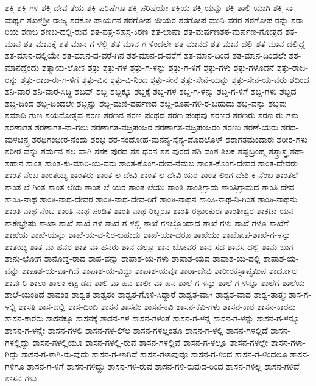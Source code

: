 ಶಕ್ತಿ
ಶಕ್ತಿ-ಗಳ
ಶಕ್ತಿ-ದೇವ-ತೆಯ
ಶಕ್ತಿ-ಪರಿಷೆಗೂ
ಶಕ್ತಿ-ಪರಿಷೆಯೇ
ಶಕ್ತಿಯ
ಶಕ್ತಿ-ಯನ್ನು
ಶಕ್ತಿ-ಶಾಲಿ-ಯಾಗಿ
ಶಕ್ತಿ-ಸಾ-ಮರ್ಥ್ಯ
ಶಖಳಶ್ರೀ-ರಾಜ್ಯ
ಶಠಕೋ-ಪಾರ್ಯನ
ಶಠಗೋಪ-ಜೀಯರ
ಶಠಗೋಪ-ಮುನಿ-ವರರ
ಶಠಗೋಪ-ರನ್ನು
ಶಠಾ-ರಿಯ
ಶಣಬ
ಶಣಬ-ದಲ್ಲಿ-ರುವ
ಶತ-ಪತ್ರ-ಸಹಸ್ರ-ಕಿರಣ
ಶತ-ಭಾಷಾ
ಶತ-ಮರ್ಷಣಶಠ-ಮರ್ಷಣ-ಗೋತ್ರದ
ಶತ-ಮಾನ
ಶತ-ಮಾನಕ್ಕೆ
ಶತ-ಮಾನ-ಗ-ಳಲ್ಲಿ
ಶತ-ಮಾನ-ಗ-ಳಿಂದಲೇ
ಶತ-ಮಾನದ
ಶತ-ಮಾನ-ದಲ್ಲಿ
ಶತ-ಮಾನ-ದಲ್ಲಿದ್ದ
ಶತ-ಮಾನ-ದಲ್ಲಿಯೇ
ಶತ-ಮಾನ-ದ-ವರೆ-ಗಿನ
ಶತ-ಮಾನ-ದ-ವರೆಗೆ
ಶತ-ಮಾನ-ದಿಂದ
ಶತ-ಮಾನ-ದಿಂದಲೇ
ಶತ-ಮಾನದ್ದೆಂದು
ಶತ್ಯಾಯ-ಲೋಕ
ಶತ್ರು
ಶತ್ರು-ಗಳ
ಶತ್ರು-ಗ-ಳನ್ನು
ಶತ್ರು-ಗ-ಳಿಗೆ
ಶತ್ರು-ಗಳು
ಶತ್ರು-ಗಳೊಡನೆ
ಶತ್ರು-ರಾಜ-ರನ್ನು
ಶತ್ರು-ರಾಜ-ರು-ಗ-ಳಿಗೆ
ಶತ್ರು-ವಿನ
ಶತ್ರು-ವಿ-ನಿಂದ
ಶತ್ರು-ಸೇನೆ
ಶತ್ರು-ಸೇನೆ-ಯನ್ನು
ಶತ್ರು-ಸೇನೆ-ಯ-ವರು
ಶದಿಂದ
ಶನಿ-ವಾರ
ಶನಿ-ವಾರ-ಸಿದ್ಧಿ
ಶಬದ್
ಶಬ್ದ
ಶಬ್ದಕ್ಕೂ
ಶಬ್ದಕ್ಕೆ
ಶಬ್ದ-ಗಳ
ಶಬ್ದ-ಗ-ಳನ್ನು
ಶಬ್ದ-ಗ-ಳಿಗೆ
ಶಬ್ದ-ಗಳು
ಶಬ್ದದ
ಶಬ್ದ-ದಿಂದ
ಶಬ್ದ-ದಿಂದಲೇ
ಶಬ್ದನ್ನು
ಶಬ್ದ-ಮಣಿ-ದರ್ಪಣದ
ಶಬ್ದ-ರೂಪ-ಗಳಿ-ರ-ಬಹುದು
ಶಬ್ದ-ವನ್ನು
ಶಬ್ದವು
ಶಮಾದಿ-ಗುಣ
ಶಯನೋತ್ಸವ
ಶರಣ
ಶರಣನ
ಶರಣ-ಪಂಥದ
ಶರಣ-ಪಂಥವು
ಶರಣರ
ಶರಣರು
ಶರಣ-ರು-ಗಳು
ಶರಣಾಗತ
ಶರಣಾಗತ-ನಾ-ಗಲು
ಶರಣಾಗತ-ವಜ್ರಪಂಜರ
ಶರಣಾಗತ-ವಜ್ರಪಂಜರಂ
ಶರಣು
ಶರಣೆ-ಯರು
ಶರದ-ಮಳಚನ್ದ್ರ
ಶರಧಿಗಂಭೀರ-ನೆಂದು
ಶರಭ
ಶರ-ಸಂದೋಹ-ಮನನ್ಯ-ಸೈನ್ಯ-ದೊಡಲೊಳ್
ಶರಾಗತಮಂದಾರಃ
ಶರೀರ-ಗಳು
ಶರೀರ-ವನ್ನು
ಶರ್ಮನ
ಶಲ-ವಾಗಿ
ಶಶಕ-ಪುರದ
ಶಶ-ಧರನ
ಶಶ-ಪುರದ
ಶಶಿ-ವಂಶ-ತಿಲಕ
ಶಷ್ಟಬ್ರಂಹ್ಮ
ಶಸ್ತ್ರಾಸ್ತ್ರ
ಶಹಾ
ಶಹಾನ
ಶಾಂತ
ಶಾಂತ-ಕು-ಮಾರಿ-ಯ-ವರು
ಶಾಂತ-ಕೊಂಗ-ದೇವ-ನೆಮಬ
ಶಾಂತ-ಕೊಂಗ-ದೇವರ
ಶಾಂತ-ದೇವರು
ಶಾಂತ-ನೆಂಬ
ಶಾಂತಯ್ಯ
ಶಾಂತರು
ಶಾಂತ-ಲ-ದೇವಿ
ಶಾಂತ-ಲ-ದೇವಿ-ಯರ
ಶಾಂತ-ಲಿಂಗ-ದೇಶಿ-ಕ-ನೆಂಬ
ಶಾಂತಲೆ
ಶಾಂತ-ಲೆ-ಗಿಂತ
ಶಾಂತ-ಲೆಯ
ಶಾಂತ-ಲೆ-ಯರ
ಶಾಂತ-ಲೆಯು
ಶಾಂತಿ
ಶಾಂತಿಗ್ರಾಮ
ಶಾಂತಿಗ್ರಾಮದ
ಶಾಂತಿ-ದೇವ
ಶಾಂತಿ-ನಾಥ
ಶಾಂತಿ-ನಾಥ-ದೇವರ
ಶಾಂತಿ-ನಾಥ-ದೇವ-ರಿಗೆ
ಶಾಂತಿ-ನಾಥನ
ಶಾಂತಿ-ನಾಥ-ನಿ-ಗಿಂತ
ಶಾಂತಿ-ನಾಥನು
ಶಾಂತಿ-ನಾಥ-ನೆಂಬ
ಶಾಂತಿ-ನಾಥ-ಪಂಡಿತ
ಶಾಂತಿ-ನಾಥ-ರಿಬ್ಬರೂ
ಶಾಂತಿ-ರಥಾಂಕುರಃ
ಶಾಂತೀಶ್ವರ
ಶಾಕಟಾ-ಯನ
ಶಾಕೇಭ್ರೇಷು
ಶಾಖಾ
ಶಾಖೆ
ಶಾಖೆ-ಗಳ
ಶಾಖೆ-ಗ-ಳಲ್ಲಿ
ಶಾಖೆ-ಗಳಲ್ಲೊಂದಾದ
ಶಾಖೆ-ಗಳು
ಶಾಖೆ-ಗಳೂ
ಶಾಖೆಗೆ
ಶಾಖೆಯ
ಶಾಖೆ-ಯನ್ನು
ಶಾಖೆ-ಯ-ವ-ನಿರ-ಬಹುದು
ಶಾಖೆ-ಯಾ-ದರೂ
ಶಾಖೆಯು
ಶಾಖೋಪ-ಶಾಖೆ-ಗ-ಳನ್ನು
ಶಾತಯ್ಯ
ಶಾತ-ವಾ-ಹನರ
ಶಾತ-ವಾ-ಹನರು
ಶಾನ-ದಲ್ಲೂ
ಶಾನ-ಬೋವರ
ಶಾನ-ಸದ
ಶಾನಸ-ದಲ್ಲಿ
ಶಾನು-ಭಾಗ
ಶಾನು-ಭೋಗ
ಶಾನೋಕ್ತ-ರಾದ
ಶಾಪ-ವನ್ನು
ಶಾಪಾಶ-ಯ-ಗಳು
ಶಾಪಾಶ-ಯದ
ಶಾಪಾಶ-ಯ-ದಲ್ಲಿ
ಶಾಪಾಶ-ಯ-ವನ್ನು
ಶಾಪಾಶ-ಯ-ವಾ-ಗಿದೆ
ಶಾಪಾಶ-ಯ-ವಿದ್ದು
ಶಾಪಾಶ-ಯವೂ
ಶಾರಾ-ದೇವಿ
ಶಾರೀರಕಸ್ಸಾಪ್ಯಮಿಪ
ಶಾರ್ದೂಲ
ಶಾರ್ವರಿ
ಶಾಲಾ
ಶಾಲಾ-ಕಟ್ಟ-ಡದ
ಶಾಲಿ-ವಾ-ಹನ
ಶಾಲೀ-ವಾ-ಹನ
ಶಾಲೆ-ಗ-ಳನ್ನು
ಶಾಲೆ-ಗ-ಳನ್ನೂ
ಶಾಲೆಗೆ
ಶಾಲೆಯ
ಶಾಲೆ-ಯಂತಿದೆ
ಶಾವಂತ
ಶಾಶ್ವತ
ಶಾಶ್ವತಂ
ಶಾಶ್ವತ-ಗೊಳಿ-ಸಿದ್ದಾರೆ
ಶಾಶ್ವತ-ವಾಗಿ
ಶಾಶ್ವತ-ವಾದ
ಶಾಶ್ವ-ತಾತ್ಮಃ
ಶಾಸ-ಗ-ಳಲ್ಲಿ
ಶಾಸತಿ
ಶಾಸ-ದಲ್ಲಿ
ಶಾಸ-ದಿಂದಿ
ಶಾಸನ
ಶಾಸನಂ
ಶಾಸನ-ಕವಿ
ಶಾಸನ-ಕವಿ-ಗಳು
ಶಾಸನ-ಕಾರ
ಶಾಸನ-ಕಾರನು
ಶಾಸನ-ಕಾರರು
ಶಾಸನಕ್ಕೂ
ಶಾಸನಕ್ಕೆ
ಶಾಸನ-ಗಳ
ಶಾಸನ-ಗಳಂತೆ
ಶಾಸನ-ಗ-ಳನ್ನ
ಶಾಸನ-ಗ-ಳನ್ನು
ಶಾಸನ-ಗ-ಳನ್ನೂ
ಶಾಸನ-ಗ-ಳನ್ನೇ
ಶಾಸನ-ಗಳಲಿ
ಶಾಸನ-ಗಳ-ಲಿ್ಲ
ಶಾಸನ-ಗಳಲ್ಲಂತೂ
ಶಾಸನ-ಗ-ಳಲ್ಲಿ
ಶಾಸನ-ಗಳಲ್ಲಿದೆ
ಶಾಸನ-ಗಳಲ್ಲಿದ್ದು
ಶಾಸನ-ಗಳಲ್ಲಿಯೂ
ಶಾಸನ-ಗಳಲ್ಲಿ-ರುವ
ಶಾಸನ-ಗಳಲ್ಲಿವೆ
ಶಾಸನ-ಗ-ಳಲ್ಲೂ
ಶಾಸನ-ಗಳಲ್ಲೇ
ಶಾಸನ-ಗಳಾ-ಗಿದ್ದು
ಶಾಸನ-ಗ-ಳಾಗಿ-ರು-ವುದು
ಶಾಸನ-ಗ-ಳಾಗಿವೆ
ಶಾಸನ-ಗಳಾವುವೂ
ಶಾಸನ-ಗ-ಳಿಂದ
ಶಾಸನ-ಗ-ಳಿಂದಲೂ
ಶಾಸನ-ಗಳಿಗೂ
ಶಾಸನ-ಗ-ಳಿಗೆ
ಶಾಸನ-ಗಳಿದ್ದು
ಶಾಸನ-ಗಳಿ-ರುವ
ಶಾಸನ-ಗಳಿ-ರುವುದ-ರಿಂದ
ಶಾಸನ-ಗಳಿಲ್ಲ
ಶಾಸನ-ಗಳಿವೆ
ಶಾಸನ-ಗಳು

